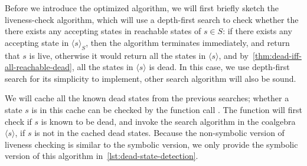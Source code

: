 \documentclass[conference]{IEEEtran}
\DeclareMathOperator{\norm}{\mathrm{norm}}
\begin{document}


Before we introduce the optimized algorithm, we will first briefly sketch the liveness-check algorithm, which will use a depth-first search to check whether the there exists any accepting states in reachable states of \(s ∈ S\): if there exists any accepting state in \(⟨s⟩_S\), then the algorithm terminates immediately, and return that \(s\) is live, otherwise it would return all the states in \(⟨s⟩\), and by~\cref{thm:dead-iff-all-reachable-dead}, all the states in \(⟨s⟩\) is dead.
In this case, we use depth-first search for its simplicity to implement, other search algorithm will also be sound.

We will cache all the known dead states from the previous searches; whether a state \(s\) is in this cache can be checked by the function call . 
The function  will first check if \(s\) is known to be dead, and invoke the search algorithm in the coalgebra \(⟨s⟩\), if \(s\) is not in the cached dead states.
Because the non-symbolic version of liveness checking is similar to the symbolic version, we only provide the symbolic version of this algorithm in~\cref{lst:dead-state-detection}.
\end{document}

